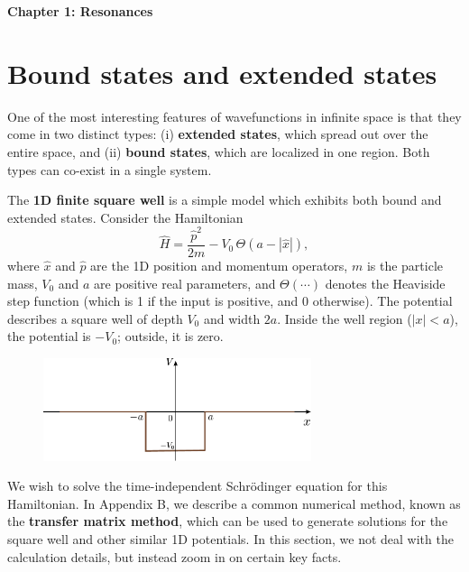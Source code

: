\documentclass[pra,12pt]{revtex4}
\begin{document}
\begin{center}
{\Large \textbf{Chapter 1: Resonances}}
\end{center}

\section{Bound states and extended states}

One of the most interesting features of wavefunctions in infinite
space is that they come in two distinct types: (i) \textbf{extended
  states}, which spread out over the entire space, and (ii)
\textbf{bound states}, which are localized in one region.  Both types
can co-exist in a single system.

The \textbf{1D finite square well} is a simple model which exhibits
both bound and extended states.  Consider the Hamiltonian
$$\hat{H} = \frac{\hat{p}^2}{2m} - V_0 \,\Theta(a -|\hat{x}|),$$ where
$\hat{x}$ and $\hat{p}$ are the 1D position and momentum operators,
$m$ is the particle mass, $V_0$ and $a$ are positive real parameters,
and $\Theta(\cdots)$ denotes the Heaviside step function (which is 1
if the input is positive, and 0 otherwise).  The potential describes a
square well of depth $V_0$ and width $2a$.  Inside the well region
($|x| < a$), the potential is $-V_0$; outside, it is zero.

\begin{figure}[h]
  \centering\includegraphics[width=0.7\textwidth]{squarewell}
\end{figure}

We wish to solve the time-independent Schr\"odinger equation for this
Hamiltonian.  In Appendix B, we describe a common numerical method,
known as the \textbf{transfer matrix method}, which can be used to
generate solutions for the square well and other similar 1D
potentials.  In this section, we not deal with the calculation
details, but instead zoom in on certain key facts.
\end{document}
